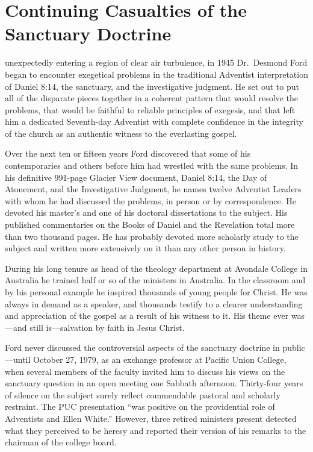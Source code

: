 \chapter{Continuing Casualties of the Sanctuary Doctrine}
\label{ch:cont}

 unexpectedly entering a region of clear air turbulence, in
1945 Dr.\ Desmond Ford began to encounter exegetical problems in the
traditional Adventist interpretation of Daniel 8:14, the sanctuary, and the
investigative judgment. He set out to put all of the disparate pieces
together in a coherent pattern that would resolve the problems, that would
be faithful to reliable principles of exegesis, and that left him a
dedicated Seventh-day Adventist with complete confidence in the integrity of
the church as an authentic witness to the everlasting gospel.

Over the next ten or fifteen years Ford discovered that some of his
contemporaries and others before him had wrestled with the same problems. In
his definitive 991-page Glacier View document, Daniel 8:14, the Day of
Atonement, and the Investigative Judgment, he names twelve Adventist Leaders
with whom he had discussed the problems, in person or by correspondence. He
devoted his master's and one of his doctoral dissertations to the subject.
His published commentaries on the Books of Daniel and the Revelation total
more than two thousand pages. He has probably devoted more scholarly study
to the subject and written more extensively on it than any other person in
history.

During his long tenure as head of the theology department at Avondale
College in Australia he trained half or so of the ministers in Australia. In
the classroom and by his personal example he inspired thousands of young
people for Christ. He was always in demand as a speaker, and thousands
testify to a clearer understanding and appreciation of the gospel as a
result of his witness to it. His theme ever was---and still is---salvation
by faith in Jesus Christ.

Ford never discussed the controversial aspects of the sanctuary doctrine in
public---until October 27, 1979, as an exchange professor at Pacific Union
College, when several members of the faculty invited him to discuss his
views on the sanctuary question in an open meeting one Sabbath afternoon.
Thirty-four years of silence on the subject surely reflect commendable
pastoral and scholarly restraint. The PUC presentation ``was positive on the 
providential role of Adventists and Ellen White.'' However, three retired
ministers present detected what they perceived to be heresy and reported
their version of his remarks to the chairman of the college board. 

